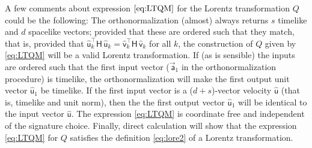 \documentclass{article}
\newcommand{\metric}{\mathsf{H}}
\newcommand\upvec[1]{\!\vec{\,\mathrm{#1}}}
\newcommand{\Lvec}[1]{\upvec{\mathsf{#1}}} %
\newcommand{\Lhat}[1]{\hat{\mathsf{#1}}} %
\newcommand{\plus}{\!+\!} %
\begin{document}
A few comments about expression $\eqref{eq:LTQM}$ for the Lorentz transformation $Q$ could be the following:
The orthonormalization (almost) always returns $s$ timelike and $d$ spacelike vectors;
provided that these are ordered such that they match, that is, provided that $\Lhat{u}_k^\top\metric\,\Lhat{u}_k=\Lhat{v}_k^\top\metric\,\Lhat{v}_k$ for all $k$, the construction of $Q$ given by \eqref{eq:LTQM} will be a valid Lorentz transformation.
If (as is sensible) the inputs are ordered such that the first input vector ($\Lvec{a}_1$ in the orthonormalization procedure) is timelike, the orthonormalization will make the first output unit vector $\Lhat{u}_1$ be timelike.
If the first input vector is a ($d\plus s$)-vector velocity $\Lhat{u}$ (that is, timelike and unit norm), then the the first output vector $\Lhat{u}_1$ will be identical to the input vector $\Lhat{u}$.
The expression \eqref{eq:LTQM} is coordinate free and independent of the signature choice.
Finally, direct calculation will show that the expression \eqref{eq:LTQM} for $Q$ satisfies the definition \eqref{eq:lore2} of a Lorentz transformation.
\end{document}
